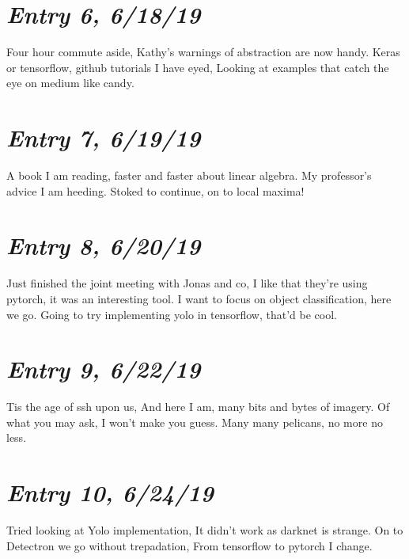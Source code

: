 \documentclass{article}
\begin{document}
\section{\Large \itshape  Entry 6, 6/18/19}
    Four hour commute aside,
\newline
Kathy's warnings of abstraction are now handy.
\newline
Keras or tensorflow, github tutorials I have eyed,
\newline
Looking at examples that catch the eye on medium like candy.

\section{\Large \itshape  Entry 7, 6/19/19}
    A book I am reading,
\newline
faster and faster about linear algebra.
\newline
My professor's advice I am heeding.
\newline
Stoked to continue, on to local maxima!

\section{\Large \itshape  Entry 8, 6/20/19}
    Just finished the joint meeting with Jonas and co,
\newline
I like that they're using pytorch, it was an interesting tool.
\newline
I want to focus on object classification, here we go.
\newline
Going to try implementing yolo in tensorflow, that'd be cool.

\section{\Large \itshape  Entry 9, 6/22/19}
    Tis the age of ssh upon us,
\newline
And here I am, many bits and bytes of imagery.
\newline
Of what you may ask, I won't make you guess.
\newline
Many many pelicans, no more no less.

\section{\Large \itshape  Entry 10, 6/24/19}
    Tried looking at Yolo implementation,
\newline
It didn't work as darknet is strange.
\newline
On to Detectron we go without trepadation,
\newline
From tensorflow to pytorch I change.
\end{document}
